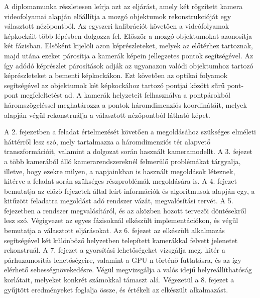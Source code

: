 A diplomamunka részletesen leírja azt az eljárást, amely két rögzített kamera videofolyamai alapján előállítja a mozgó objektumok rekonstrukcióját egy választott nézőpontból. Az egyszeri kalibrációt követően a videófolyamok képkockáit több lépésben dolgozza fel. Először a mozgó objektumokat azonosítja két fázisban. Elsőként kijelöli azon képrészleteket, melyek az előtérhez tartoznak, majd utána ezeket párosítja a kamerák képein jellegzetes pontok segítségével. Az így adódó képrészlet párosítások adják az ugyanazon valódi objektumhoz tartozó képrészleteket a bementi képkockákon. Ezt követően az optikai folyamok segítségével az objektumok két képkockához tartozó pontjai között sűrű pont-pont megfeleltetést ad. A kamerák helyzeteit felhasználva a pontpárokból háromszögeléssel meghatározza a pontok háromdimenziós koordinátáit, melyek alapján végül rekonstruálja a választott nézőpontból látható képet.

A 2. fejezetben a feladat értelmezését követően a megoldásához szükséges elméleti háttérről lesz szó, mely tartalmazza a háromdimenziós tér alapvető transzformációit, valamint a dolgozat során használt kameramodellt. A 3. fejezet a több kamerából álló kamerarendszereknél felmerülő problémákat tárgyalja, illetve, hogy ezekre milyen, a napjainkban is használt megoldások léteznek, kitérve a feladat során szükséges részproblémák megoldására is. A 4. fejezet bemutatja az előző fejezetek által leírt információk és algoritmusok alapján egy, a kitűzött feladatra megoldást adó rendszer vázát, megvalósítási tervét. A 5. fejezetben a rendszer megvalósítáról, és az aközben hozott tervezői döntésekről lesz szó. Végigvezet az egyes fázisoknál elkészült implementációkon, és végül bemutatja a választott eljárásokat. Az 6. fejezet az elkészült alkalmazás segítségével két különböző helyzetben telepített kamerákkal felvett jelenetet rekonstruál. A 7. fejezet a gyorsítási lehetőségeket vizsgálja meg, kitér a párhuzamosítás lehetőségeire, valamint a GPU-n történő futtatásra, és az így elérhető sebességnövekedésre. Végül megvizsgálja a valós idejű helyreállíthatóság korlátait, melyeket konkrét számokkal támaszt alá. Végezetül a 8. fejezet a gyűjtött eredményeket foglalja össze, és értékeli az elkészült alkalmazást.
